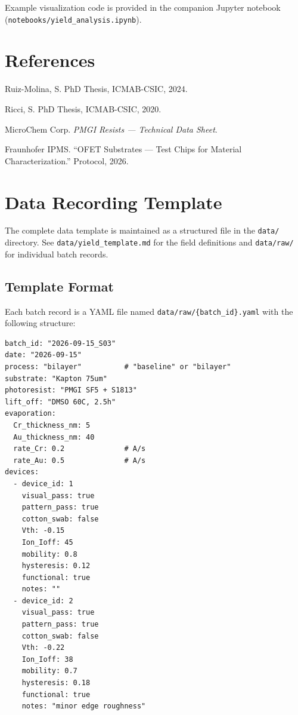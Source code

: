 \documentclass[11pt,a4paper]{article}
\begin{document}
Example visualization code is provided in the companion Jupyter notebook
(\texttt{notebooks/yield\_analysis.ipynb}).

\section{References}

\begin{enumerate}[label={[\arabic*]}]
    \item Ruiz-Molina, S. PhD Thesis, ICMAB-CSIC, 2024.
    \item Ricci, S. PhD Thesis, ICMAB-CSIC, 2020.
    \item MicroChem Corp. \textit{PMGI Resists --- Technical Data Sheet}.
    \item Fraunhofer IPMS. ``OFET Substrates --- Test Chips for Material
          Characterization.'' Protocol, 2026.
\end{enumerate}

\appendix
\section{Data Recording Template}
\label{app:template}

The complete data template is maintained as a structured file in the
\texttt{data/} directory. See \texttt{data/yield\_template.md} for the
field definitions and \texttt{data/raw/} for individual batch records.

\subsection{Template Format}

Each batch record is a YAML file named
\texttt{data/raw/\{batch\_id\}.yaml} with the following structure:

\begin{verbatim}
batch_id: "2026-09-15_S03"
date: "2026-09-15"
process: "bilayer"          # "baseline" or "bilayer"
substrate: "Kapton 75um"
photoresist: "PMGI SF5 + S1813"
lift_off: "DMSO 60C, 2.5h"
evaporation:
  Cr_thickness_nm: 5
  Au_thickness_nm: 40
  rate_Cr: 0.2              # A/s
  rate_Au: 0.5              # A/s
devices:
  - device_id: 1
    visual_pass: true
    pattern_pass: true
    cotton_swab: false
    Vth: -0.15
    Ion_Ioff: 45
    mobility: 0.8
    hysteresis: 0.12
    functional: true
    notes: ""
  - device_id: 2
    visual_pass: true
    pattern_pass: true
    cotton_swab: false
    Vth: -0.22
    Ion_Ioff: 38
    mobility: 0.7
    hysteresis: 0.18
    functional: true
    notes: "minor edge roughness"
\end{verbatim}
\end{document}
